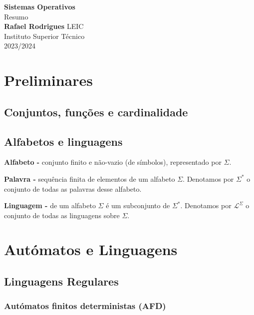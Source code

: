 \documentclass[11pt]{article}
\begin{document}
\begin{titlepage}
    \centering
    \vspace*{4cm}
    \textbf{\LARGE Sistemas Operativos} \\[0.5cm]
    \Large Resumo \\[2cm]
    \textbf{Rafael Rodrigues} \vfill
    LEIC \\ Instituto Superior Técnico \\ 2023/2024
\end{titlepage}

\tableofcontents

\setlength\parskip{1em plus 0.1em minus 0.2em}
\setlength{\parindent}{0pt}

\newpage

\section{Preliminares}

\subsection{Conjuntos, funções e cardinalidade}

\subsection{Alfabetos e linguagens}

\textbf{Alfabeto -} conjunto finito e não-vazio (de símbolos), representado por $\Sigma$.

\textbf{Palavra -} sequência finita de elementos de um alfabeto $\Sigma$. Denotamos por $\Sigma^*$ o conjunto de todas as palavras desse alfabeto. 

\textbf{Linguagem -} de um alfabeto $\Sigma$ é um subconjunto de $\Sigma^*$. Denotamos por $\mathcal{L}^\Sigma$ o conjunto de todas as linguagens sobre $\Sigma$.

\section{Autómatos e Linguagens}

\subsection{Linguagens Regulares}

\subsubsection{Autómatos finitos deterministas (AFD)}
\end{document}
